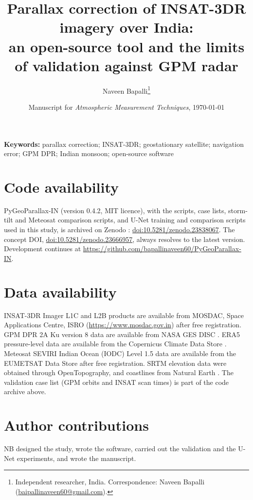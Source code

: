 \documentclass[11pt,a4paper]{article}
\title{Parallax correction of INSAT-3DR imagery over India:\\an open-source tool and the limits of validation against GPM radar}
\author{Naveen Bapalli\thanks{Independent researcher, India. Correspondence: Naveen Bapalli (\href{mailto:baipallinaveen60@gmail.com}{baipallinaveen60@gmail.com}).}}
\date{Manuscript for \textit{Atmospheric Measurement Techniques}, \today}
\providecommand{\doi}[1]{\href{https://doi.org/#1}{doi:#1}}
\begin{document}
\maketitle



\noindent\textbf{Keywords:} parallax correction; INSAT-3DR; geostationary satellite; navigation error; GPM DPR; Indian monsoon; open-source software











\appendix


\section*{Code availability}
{\sloppy
PyGeoParallax-IN (version 0.4.2, MIT licence), with the scripts, case lists, storm-tilt and Meteosat comparison scripts, and U-Net training and comparison scripts used in this study, is archived on Zenodo \citep{pygeoparallax}: \doi{10.5281/zenodo.23838067}. The concept DOI, \doi{10.5281/zenodo.23666957}, always resolves to the latest version. Development continues at \url{https://github.com/bapallinaveen60/PyGeoParallax-IN}.\par}

\section*{Data availability}
{\sloppy
INSAT-3DR Imager L1C and L2B products are available from MOSDAC, Space Applications Centre, ISRO (\url{https://www.mosdac.gov.in}) after free registration. GPM DPR 2A Ku version 8 data are available from NASA GES DISC \citep{gpm2aku_v08}. ERA5 pressure-level data are available from the Copernicus Climate Data Store \citep{c3s2018}. Meteosat SEVIRI Indian Ocean (IODC) Level 1.5 data are available from the EUMETSAT Data Store \citep{eumetsat_iodc} after free registration. SRTM elevation data \citep{farr2007} were obtained through OpenTopography, and coastlines from Natural Earth \citep{naturalearth}. The validation case list (GPM orbits and INSAT scan times) is part of the code archive above.\par}

\section*{Author contributions}
NB designed the study, wrote the software, carried out the validation and the U-Net experiments, and wrote the manuscript.
\end{document}
